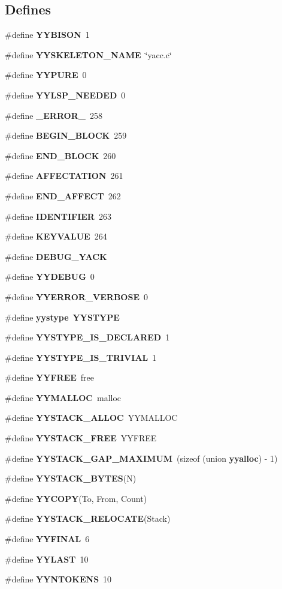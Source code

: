 \subsection*{Defines}
\begin{CompactItemize}
\item 
\#define {\bf YYBISON}\ 1
\item 
\#define {\bf YYSKELETON\_\-NAME}\ \char`\"{}yacc.c\char`\"{}
\item 
\#define {\bf YYPURE}\ 0
\item 
\#define {\bf YYLSP\_\-NEEDED}\ 0
\item 
\#define {\bf \_\-ERROR\_\-}\ 258
\item 
\#define {\bf BEGIN\_\-BLOCK}\ 259
\item 
\#define {\bf END\_\-BLOCK}\ 260
\item 
\#define {\bf AFFECTATION}\ 261
\item 
\#define {\bf END\_\-AFFECT}\ 262
\item 
\#define {\bf IDENTIFIER}\ 263
\item 
\#define {\bf KEYVALUE}\ 264
\item 
\#define {\bf DEBUG\_\-YACK}
\item 
\#define {\bf YYDEBUG}\ 0
\item 
\#define {\bf YYERROR\_\-VERBOSE}\ 0
\item 
\#define {\bf yystype}\ {\bf YYSTYPE}
\item 
\#define {\bf YYSTYPE\_\-IS\_\-DECLARED}\ 1
\item 
\#define {\bf YYSTYPE\_\-IS\_\-TRIVIAL}\ 1
\item 
\#define {\bf YYFREE}\ free
\item 
\#define {\bf YYMALLOC}\ malloc
\item 
\#define {\bf YYSTACK\_\-ALLOC}\ YYMALLOC
\item 
\#define {\bf YYSTACK\_\-FREE}\ YYFREE
\item 
\#define {\bf YYSTACK\_\-GAP\_\-MAXIMUM}\ (sizeof (union {\bf yyalloc}) - 1)
\item 
\#define {\bf YYSTACK\_\-BYTES}(N)
\item 
\#define {\bf YYCOPY}(To, From, Count)
\item 
\#define {\bf YYSTACK\_\-RELOCATE}(Stack)
\item 
\#define {\bf YYFINAL}\ 6
\item 
\#define {\bf YYLAST}\ 10
\item 
\#define {\bf YYNTOKENS}\ 10
\item 

\end{CompactItemize}
